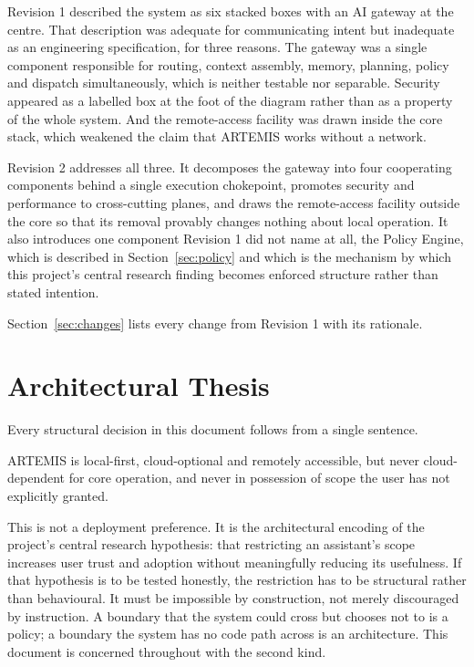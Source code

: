 \documentclass[11pt]{article}
\begin{document}
Revision 1 described the system as six stacked boxes with an AI gateway at the centre.
That description was adequate for communicating intent but inadequate as an engineering
specification, for three reasons. The gateway was a single component responsible for
routing, context assembly, memory, planning, policy and dispatch simultaneously, which is
neither testable nor separable. Security appeared as a labelled box at the foot of the
diagram rather than as a property of the whole system. And the remote-access facility was
drawn inside the core stack, which weakened the claim that ARTEMIS works without a
network.

Revision 2 addresses all three. It decomposes the gateway into four cooperating
components behind a single execution chokepoint, promotes security and performance to
cross-cutting planes, and draws the remote-access facility outside the core so that its
removal provably changes nothing about local operation. It also introduces one component
Revision 1 did not name at all, the Policy Engine, which is described in
Section~\ref{sec:policy} and which is the mechanism by which this project's central
research finding becomes enforced structure rather than stated intention.

Section~\ref{sec:changes} lists every change from Revision 1 with its rationale.

\section{Architectural Thesis}

Every structural decision in this document follows from a single sentence.

\begin{finding}
ARTEMIS is local-first, cloud-optional and remotely accessible, but never
cloud-dependent for core operation, and never in possession of scope the user has not
explicitly granted.
\end{finding}

This is not a deployment preference. It is the architectural encoding of the project's
central research hypothesis: that restricting an assistant's scope increases user trust
and adoption without meaningfully reducing its usefulness. If that hypothesis is to be
tested honestly, the restriction has to be structural rather than behavioural. It must be
impossible by construction, not merely discouraged by instruction. A boundary that the
system could cross but chooses not to is a policy; a boundary the system has no code path
across is an architecture. This document is concerned throughout with the second kind.
\end{document}
